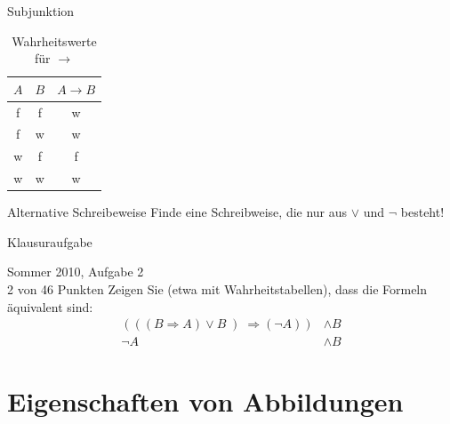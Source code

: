    \begin{frame}{Subjunktion}
        \begin{table}
            \caption{Wahrheitswerte für $\rightarrow$}
            \begin{center}
                \begin{tabular}{ccc}
                    \toprule
                    $A$ & $B$ & $A \rightarrow B$\\
                    \midrule
                    f & f & w\\
                    f & w & w\\
                    w & f & f\\
                    w & w & w\\
                    \bottomrule
                \end{tabular}
             \end{center}
        \end{table}
        \pause
        \begin{exampleblock}{Alternative Schreibeweise}
            Finde eine Schreibweise, die nur aus $\vee$ und $\neg$ besteht!\\
            \pause
        \end{exampleblock}
    \end{frame}

    \begin{frame}{Klausuraufgabe}
        \begin{exampleblock}{Sommer 2010, Aufgabe 2\\ 2 von 46 Punkten}
            Zeigen Sie (etwa mit Wahrheitstabellen), dass die Formeln äquivalent sind:
            \begin{align*}
                \left(\left(\left( B \Rightarrow A\right)\vee B\left) \Rightarrow \left(\neg A\right)\right) &\wedge B\\
                \neg A &\wedge B
            \end{align*}
        \end{exampleblock}
    \end{frame}

\section{Eigenschaften von Abbildungen}
